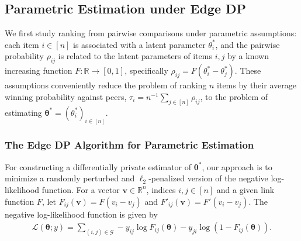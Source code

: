 \documentclass[letterpaper,12pt]{article}
\numberwithin{equation}{section}
\theoremstyle{plain}
\numberwithin{Theorem}{section}
\numberwithin{corollary}{section}
\numberwithin{proposition}{section}
\numberwithin{Lemma}{section}
{
	\theoremstyle{definition}
	\newtheorem{Definition}{Definition}
	\newtheorem{example}{Example}
	\numberwithin{example}{section}
	\newtheorem{fact}{Fact}
	\numberwithin{fact}{section}
	\newtheorem{remark}{Remark}
}
\newcommand{\1}{\mathbbm{1}}
\def\bth{{\boldsymbol{\theta}}}
\def\R{{\mathbb R}}
\begin{document}
\vspace{-5mm}
\subsection{Parametric Estimation under Edge DP}
\label{sec: ranking upper bound}

We first study ranking from pairwise comparisons under parametric assumptions: each item $i \in [n]$ is associated with a latent parameter $\theta^*_i$, and the pairwise probability $\rho_{ij}$ is related to the latent parameters of items $i, j$ by a known increasing function $F: \R \to [0, 1]$, specifically $\rho_{ij} = F(\theta^*_i - \theta^*_j)$.  These assumptions conveniently reduce the problem of ranking $n$ items by their average winning probability against peers, $\tau_i = n^{-1}\sum_{j \in [n]} \rho_{ij}$, to the problem of estimating $\bth^* = \left(\theta^*_i\right)_{i \in [n]}$. 



\subsubsection{The Edge DP Algorithm for Parametric Estimation}\label{sec: edge dp ranking upper bound}
For constructing a differentially private estimator of $\bth^*$, our approach is to minimize a randomly perturbed and $\ell_2$-penalized version of the negative log-likelihood function. For a vector $\bm v \in \R^n$, indices $i, j \in [n]$ and a given link function $F$, let $F_{ij}(\bm v) = F(v_i - v_j)$ and $F'_{ij}(\bm v) = F'(v_i - v_j)$. The negative log-likelihood function is given by
\begin{align}\label{eq: ranking likelihood equation}
	\mathcal L(\bth; y) = \sum_{(i, j) \in \mathcal G} -y_{ij}\log F_{ij}(\bth) - y_{ji}\log(1 - F_{ij}(\bth)).
\end{align}
\end{document}
